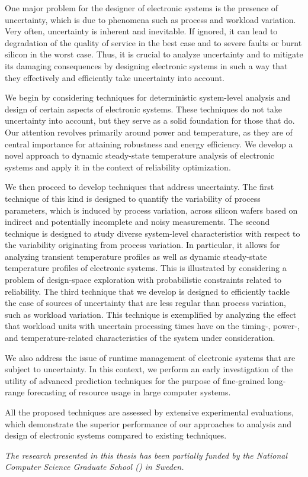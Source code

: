 One major problem for the designer of electronic systems is the presence of
uncertainty, which is due to phenomena such as process and workload variation.
Very often, uncertainty is inherent and inevitable. If ignored, it can lead to
degradation of the quality of service in the best case and to severe faults or
burnt silicon in the worst case. Thus, it is crucial to analyze uncertainty and
to mitigate its damaging consequences by designing electronic systems in such a
way that they effectively and efficiently take uncertainty into account.

We begin by considering techniques for deterministic system-level analysis and
design of certain aspects of electronic systems. These techniques do not take
uncertainty into account, but they serve as a solid foundation for those that
do. Our attention revolves primarily around power and temperature, as they are
of central importance for attaining robustness and energy efficiency. We develop
a novel approach to dynamic steady-state temperature analysis of electronic
systems and apply it in the context of reliability optimization.

We then proceed to develop techniques that address uncertainty. The first
technique of this kind is designed to quantify the variability of process
parameters, which is induced by process variation, across silicon wafers based
on indirect and potentially incomplete and noisy measurements. The second
technique is designed to study diverse system-level characteristics with respect
to the variability originating from process variation. In particular, it allows
for analyzing transient temperature profiles as well as dynamic steady-state
temperature profiles of electronic systems. This is illustrated by considering a
problem of design-space exploration with probabilistic constraints related to
reliability. The third technique that we develop is designed to efficiently
tackle the case of sources of uncertainty that are less regular than process
variation, such as workload variation. This technique is exemplified by
analyzing the effect that workload units with uncertain processing times have on
the timing-, power-, and temperature-related characteristics of the system under
consideration.

We also address the issue of runtime management of electronic systems that are
subject to uncertainty. In this context, we perform an early investigation of
the utility of advanced prediction techniques for the purpose of fine-grained
long-range forecasting of resource usage in large computer systems.

All the proposed techniques are assessed by extensive experimental evaluations,
which demonstrate the superior performance of our approaches to analysis and
design of electronic systems compared to existing techniques.

\vspace{1em}
\noindent
\emph{
  The research presented in this thesis has been partially funded by the
  National Computer Science Graduate School () in Sweden.
}
